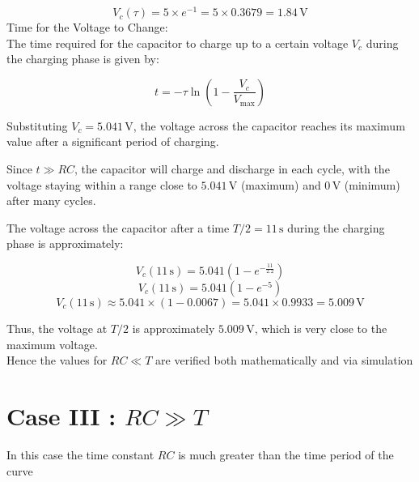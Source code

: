 \documentclass[journal]{IEEEtran}
\begin{document}
\[
V_c(\tau) = 5 \times e^{-1} = 5 \times 0.3679 = 1.84 \, \text{V}
\]
Time for the Voltage to Change: \\

The time required for the capacitor to charge up to a certain voltage \( V_c \) during the charging phase is given by:

\[
t = -\tau \ln \left( 1 - \frac{V_c}{V_{\text{max}}} \right)
\]

Substituting \( V_c = 5.041 \, \text{V} \), the voltage across the capacitor reaches its maximum value after a significant period of charging.

Since \( t \gg RC \), the capacitor will charge and discharge in each cycle, with the voltage staying within a range close to \( 5.041 \, \text{V} \) (maximum) and \( 0 \, \text{V} \) (minimum) after many cycles.

The voltage across the capacitor after a time \( T/2 = 11 \, \text{s} \) during the charging phase is approximately:

\[
V_c(11 \, \text{s}) = 5.041 \left( 1 - e^{-\frac{11}{2.2}} \right)
\]
\[
V_c(11 \, \text{s}) = 5.041 \left( 1 - e^{-5} \right)
\]
\[
V_c(11 \, \text{s}) \approx 5.041 \times (1 - 0.0067) = 5.041 \times 0.9933 = 5.009 \, \text{V}
\]

Thus, the voltage at \( T/2 \) is approximately \( 5.009 \, \text{V} \), which is very close to the maximum voltage. \\ 
Hence the values for $RC\ll T$ are verified both mathematically and via simulation 

\section{Case III : $RC \gg T$}
In this case the time constant $RC$ is much greater than  the time period of the curve 
\end{document}
